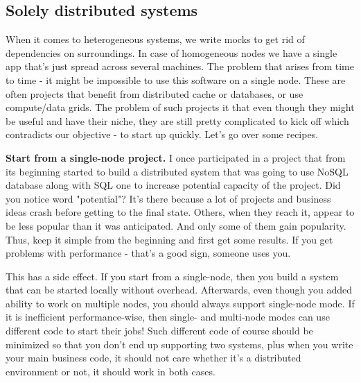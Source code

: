 \subsection{Solely distributed systems}
When it comes to heterogeneous systems, we write mocks to get rid of dependencies on surroundings. In case of homogeneous nodes we have a single app that's just spread across several machines. The problem that arises from time to time - it might be impossible to use this software on a single node. These are often projects that benefit from distributed cache or databases, or use compute/data grids. The problem of such projects it that even though they might be useful and have their niche, they are still pretty complicated to kick off which contradicts our objective - to start up quickly. Let's go over some recipes.

\textbf{Start from a single-node project.} I once participated in a project that from its beginning started to build a distributed system that was going to use NoSQL database along with SQL one to increase potential capacity of the project. Did you notice word "potential"? It's there because a lot of projects and business ideas crash before getting to the final state. Others, when they reach it, appear to be less popular than it was anticipated. And only some of them gain popularity. Thus, keep it simple from the beginning and first get some results. If you get problems with performance - that's a good sign, someone uses you.

This has a side effect. If you start from a single-node, then you build a system that can be started locally without overhead. Afterwards, even though you added ability to work on multiple nodes, you should always support single-node mode. If it is inefficient performance-wise, then single- and multi-node modes can use different code to start their jobs! Such different code of course should be minimized so that you don't end up supporting two systems, plus when you write your main business code, it should not care whether it's a distributed environment or not, it should work in both cases.
